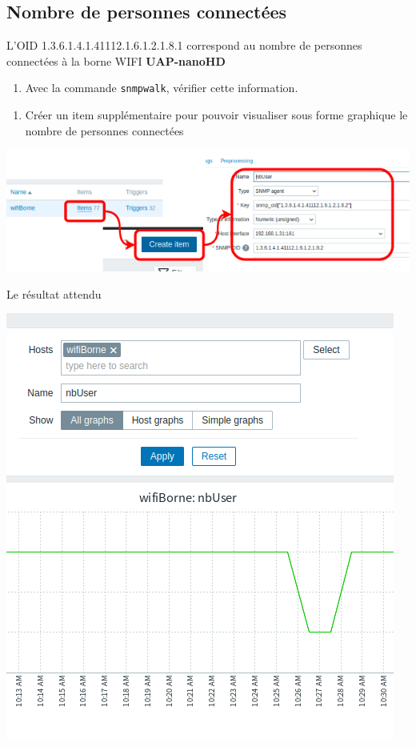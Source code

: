 \documentclass[french, 12pt]{article}%
\newif\ifPROF
\begin{document}
\normalcolor
\fi


\subsection{Nombre de personnes connectées}
L'OID 1.3.6.1.4.1.41112.1.6.1.2.1.8.1 correspond au nombre de personnes connectées à la borne WIFI \textbf{UAP-nanoHD}

\begin{enumerate}[resume]
\item Avec la commande \verb?snmpwalk?, vérifier cette information. 
\end{enumerate}

\ifPROF
\color{red}
\begin{lstlisting}[style=commande] 
snmpwalk -v2c -c public 192.168.1.31 1.3.6.1.4.1.41112.1.6.1.2.1.8.2
\end{lstlisting}
\normalcolor
\fi

\begin{enumerate}[resume]
\item Créer un item supplémentaire pour pouvoir visualiser sous forme graphique le nombre de personnes connectées
\end{enumerate}

\begin{center}
\includegraphics[scale=0.7]{./ressource/itemWifi.drawio.png}
\end{center}

Le résultat attendu 
\begin{center}
\includegraphics[scale=0.4]{./ressource/nbUserGraph}
\end{center}
\end{document}
